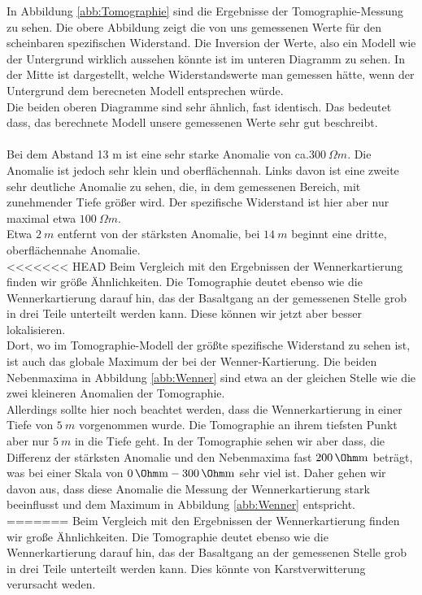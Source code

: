 In Abbildung \ref{abb:Tomographie} sind die Ergebnisse der Tomographie-Messung zu sehen. Die obere Abbildung zeigt die von uns gemessenen Werte für den scheinbaren spezifischen Widerstand. Die Inversion der Werte, also ein Modell wie der Untergrund 
wirklich aussehen könnte ist im unteren Diagramm zu sehen. In der Mitte ist dargestellt, welche Widerstandswerte man gemessen hätte, wenn der Untergrund dem berecneten Modell entsprechen würde.\\
Die beiden oberen Diagramme sind sehr ähnlich, fast identisch. Das bedeutet dass, das berechnete Modell unsere gemessenen Werte sehr gut beschreibt. \\
\\
Bei dem Abstand 13 m ist eine sehr starke Anomalie von ca.$ \SI{ 300}{\Omega m}$. Die Anomalie ist jedoch sehr klein und oberflächennah. Links davon ist eine zweite sehr deutliche Anomalie zu sehen, die, in dem gemessenen Bereich,
mit zunehmender Tiefe größer wird. Der spezifische Widerstand ist hier aber nur maximal etwa $\SI{100}{\Omega m}$. \\
Etwa $\SI{2}{m}$ entfernt von der stärksten Anomalie, bei  $\SI{14}{m}$ beginnt eine dritte, oberflächennahe Anomalie. \\
<<<<<<< HEAD
Beim Vergleich mit den Ergebnissen der Wennerkartierung finden wir größe Ähnlichkeiten. Die Tomographie deutet ebenso wie die Wennerkartierung darauf hin, das der Basaltgang an der gemessenen Stelle grob in drei Teile unterteilt werden kann. 
Diese können wir jetzt aber besser lokalisieren.\\
Dort, wo im Tomographie-Modell der größte spezifische Widerstand zu sehen ist, ist auch das globale Maximum der bei der Wenner-Kartierung. Die beiden Nebenmaxima in Abbildung \ref{abb:Wenner}
sind etwa an der gleichen Stelle wie die zwei kleineren Anomalien der Tomographie. \\ 
Allerdings sollte hier noch beachtet werden, dass die Wennerkartierung in einer Tiefe von $\SI{5}{m}$ vorgenommen wurde. Die Tomographie an ihrem tiefsten Punkt aber nur $\SI{5}{m}$ in die Tiefe geht.
In der Tomographie sehen wir aber dass, die Differenz der stärksten Anomalie und den Nebenmaxima fast $\SI{200}{\Ohm m}$ beträgt, was bei einer Skala von $\SI{0}{\Ohm m}- \SI{300}{\Ohm m}$ sehr viel ist. 
Daher gehen wir davon aus, dass diese Anomalie die Messung der Wennerkartierung stark beeinflusst und dem Maximum in Abbildung \ref{abb:Wenner} entspricht. \\
=======
Beim Vergleich mit den Ergebnissen der Wennerkartierung finden wir große Ähnlichkeiten. Die Tomographie deutet ebenso wie die Wennerkartierung darauf hin, das der Basaltgang an der gemessenen Stelle grob in drei Teile unterteilt werden kann. Dies könnte von Karstverwitterung verursacht weden.

